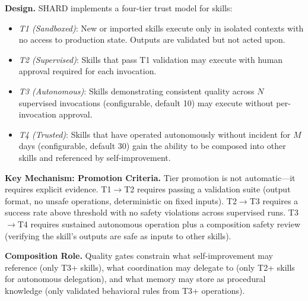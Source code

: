 \documentclass[11pt]{article}
\begin{document}
\textbf{Design.} SHARD implements a four-tier trust model for skills:

\begin{itemize}[nosep]
\item \emph{T1 (Sandboxed)}: New or imported skills execute only in isolated contexts with no access to production state. Outputs are validated but not acted upon.
\item \emph{T2 (Supervised)}: Skills that pass T1 validation may execute with human approval required for each invocation.
\item \emph{T3 (Autonomous)}: Skills demonstrating consistent quality across $N$ supervised invocations (configurable, default 10) may execute without per-invocation approval.
\item \emph{T4 (Trusted)}: Skills that have operated autonomously without incident for $M$ days (configurable, default 30) gain the ability to be composed into other skills and referenced by self-improvement.
\end{itemize}

\textbf{Key Mechanism: Promotion Criteria.} Tier promotion is not automatic---it requires explicit evidence. T1$\rightarrow$T2 requires passing a validation suite (output format, no unsafe operations, deterministic on fixed inputs). T2$\rightarrow$T3 requires a success rate above threshold with no safety violations across supervised runs. T3$\rightarrow$T4 requires sustained autonomous operation plus a composition safety review (verifying the skill's outputs are safe as inputs to other skills).

\textbf{Composition Role.} Quality gates constrain what self-improvement may reference (only T3+ skills), what coordination may delegate to (only T2+ skills for autonomous delegation), and what memory may store as procedural knowledge (only validated behavioral rules from T3+ operations).
\end{document}
